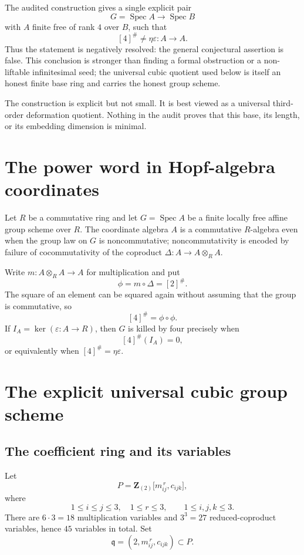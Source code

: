 \documentclass[11pt]{article}
\theoremstyle{remark}
\newcommand{\Z}{\mathbf Z}
\newcommand{\Spec}{\operatorname{Spec}}
\newcommand{\q}{\mathfrak q}
\newcommand{\eps}{\varepsilon}
\begin{document}
The audited construction gives a single explicit pair
\[
  G=\Spec A \longrightarrow \Spec B
\]
with \(A\) finite free of rank \(4\) over \(B\), such that
\[
  [4]^\#\ne\eta\eps:A\longrightarrow A.
\]
Thus the statement is negatively resolved: the general conjectural assertion
is false.  This conclusion is stronger than finding a formal obstruction or
a non-liftable infinitesimal seed; the universal cubic quotient used below is
itself an honest finite base ring and carries the honest group scheme.

The construction is explicit but not small.  It is best viewed as a
universal third-order deformation quotient.  Nothing in the audit proves
that this base, its length, or its embedding dimension is minimal.

\section{The power word in Hopf-algebra coordinates}

Let \(R\) be a commutative ring and let \(G=\Spec A\) be a finite locally
free affine group scheme over \(R\).  The coordinate algebra \(A\) is a
commutative \(R\)-algebra even when the group law on \(G\) is noncommutative;
noncommutativity is encoded by failure of cocommutativity of the coproduct
\(\Delta:A\to A\otimes_R A\).

Write \(m:A\otimes_R A\to A\) for multiplication and put
\[
  \phi=m\circ\Delta=[2]^\#.
\]
The square of an element can be squared again without assuming that the group
is commutative, so
\[
  [4]^\#=\phi\circ\phi.
\]
If \(I_A=\ker(\eps:A\to R)\), then \(G\) is killed by four precisely when
\[
  [4]^\#(I_A)=0,
\]
or equivalently when \([4]^\#=\eta\eps\).

\section{The explicit universal cubic group scheme}

\subsection{The coefficient ring and its variables}

Let
\[
 P=\Z_{(2)}\bigl[m_{ij}^{\,r},c_{ijk}\bigr],
\]
where
\[
  1\le i\le j\le3,\quad 1\le r\le3,
  \qquad 1\le i,j,k\le3.
\]
There are \(6\cdot3=18\) multiplication variables and \(3^3=27\)
reduced-coproduct variables, hence \(45\) variables in total.  Set
\[
  \q=(2,m_{ij}^{\,r},c_{ijk})\subset P.
\]
\end{document}
